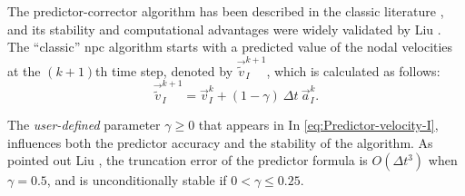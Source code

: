 \documentclass[preprint,12pt,a4paper]{elsarticle}
\begin{document}
The predictor-corrector algorithm has
been described in the classic literature \cite{Hughes2000}, and its
stability and computational advantages were widely validated by Liu
\cite{Xiaojian94}. The ``classic'' \acrfull{npc} algorithm starts with a
predicted value of the nodal velocities at the $(k+1)$th time step, denoted by $\vec{\tilde{v}}_I^{k+1}$, which is calculated as follows:
\begin{equation}
  \label{eq:Predictor-velocity-I}
  \vec{\tilde{v}}_I^{k+1} = \vec{v}_I^k + (1 - \gamma)\ \Delta t\ \vec{a}_I^k.
\end{equation}

The \textit{user-defined}
parameter $\gamma \geq 0$ that appears in In \eqref{eq:Predictor-velocity-I}, influences both the predictor accuracy
and the stability of the algorithm. As pointed out Liu
\cite{Xiaojian94}, the truncation error of the predictor formula is
$O(\Delta t^3)$ when $\gamma = 0.5$, and is unconditionally stable if
$ 0 < \gamma \leq 0.25$.
\end{document}
